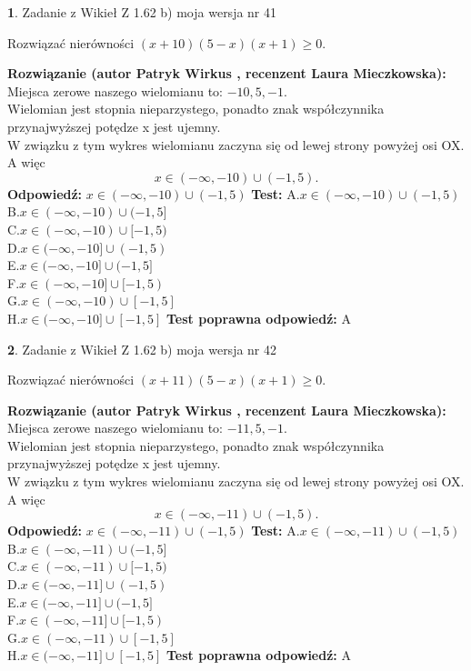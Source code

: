 \documentclass[12pt, a4paper]{article}
\theoremstyle{definition} %
\newtheorem{zad}{}
\newcommand{\zadStart}[1]{\begin{zad}#1\newline}
\newcommand{\zadStop}{\end{zad}}
\newcommand{\rozwStart}[2]{\noindent \textbf{Rozwiązanie (autor #1 , recenzent #2): }\newline}
\newcommand{\rozwStop}{\newline}
\newcommand{\odpStart}{\noindent \textbf{Odpowiedź:}\newline}
\newcommand{\odpStop}{\newline}
\newcommand{\testStart}{\noindent \textbf{Test:}\newline}
\newcommand{\testStop}{\newline}
\newcommand{\kluczStart}{\noindent \textbf{Test poprawna odpowiedź:}\newline}
\newcommand{\kluczStop}{\newline}
\begin{document}
\zadStart{Zadanie z Wikieł Z 1.62 b) moja wersja nr 41}

Rozwiązać nierówności $(x+10)(5-x)(x+1)\ge0$.
\zadStop
\rozwStart{Patryk Wirkus}{Laura Mieczkowska}
Miejsca zerowe naszego wielomianu to: $-10, 5, -1$.\\
Wielomian jest stopnia nieparzystego, ponadto znak współczynnika przy\linebreak najwyższej potędze x jest ujemny.\\ W związku z tym wykres wielomianu zaczyna się od lewej strony powyżej osi OX. A więc $$x \in (-\infty,-10) \cup (-1,5).$$
\rozwStop
\odpStart
$x \in (-\infty,-10) \cup (-1,5)$
\odpStop
\testStart
A.$x \in (-\infty,-10) \cup (-1,5)$\\
B.$x \in (-\infty,-10) \cup (-1,5]$\\
C.$x \in (-\infty,-10) \cup [-1,5)$\\
D.$x \in (-\infty,-10] \cup (-1,5)$\\
E.$x \in (-\infty,-10] \cup (-1,5]$\\
F.$x \in (-\infty,-10] \cup [-1,5)$\\
G.$x \in (-\infty,-10) \cup [-1,5]$\\
H.$x \in (-\infty,-10] \cup [-1,5]$
\testStop
\kluczStart
A
\kluczStop



\zadStart{Zadanie z Wikieł Z 1.62 b) moja wersja nr 42}

Rozwiązać nierówności $(x+11)(5-x)(x+1)\ge0$.
\zadStop
\rozwStart{Patryk Wirkus}{Laura Mieczkowska}
Miejsca zerowe naszego wielomianu to: $-11, 5, -1$.\\
Wielomian jest stopnia nieparzystego, ponadto znak współczynnika przy\linebreak najwyższej potędze x jest ujemny.\\ W związku z tym wykres wielomianu zaczyna się od lewej strony powyżej osi OX. A więc $$x \in (-\infty,-11) \cup (-1,5).$$
\rozwStop
\odpStart
$x \in (-\infty,-11) \cup (-1,5)$
\odpStop
\testStart
A.$x \in (-\infty,-11) \cup (-1,5)$\\
B.$x \in (-\infty,-11) \cup (-1,5]$\\
C.$x \in (-\infty,-11) \cup [-1,5)$\\
D.$x \in (-\infty,-11] \cup (-1,5)$\\
E.$x \in (-\infty,-11] \cup (-1,5]$\\
F.$x \in (-\infty,-11] \cup [-1,5)$\\
G.$x \in (-\infty,-11) \cup [-1,5]$\\
H.$x \in (-\infty,-11] \cup [-1,5]$
\testStop
\kluczStart
A
\kluczStop
\end{document}
